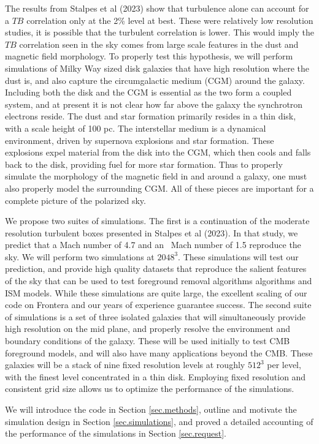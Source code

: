 The results from Stalpes et al (2023) show that turbulence alone can
account for a $TB$  correlation only at the 2\% level at best.   These were
relatively low resolution studies, it is possible that the turbulent correlation
is lower.  This would imply  the $TB$
correlation seen in the sky comes from large scale features in the dust and magnetic field
morphology.  To properly test this hypothesis, we will 
perform simulations of Milky Way sized disk galaxies 
that have high resolution where the dust is, and also capture the circumgalactic
medium (CGM) around the galaxy.  Including both the disk and the CGM is
essential as the two form a coupled system, and at present it is not clear how
far above the galaxy the synchrotron electrons reside.
The dust and star formation
primarily resides in a thin disk, with a scale height of 100 pc.  
The interstellar medium is a dynamical environment,
driven by supernova explosions and star formation.  
These explosions expel
material from the disk into the CGM, which then cools and falls back to the disk,
providing fuel for more star formation.  Thus to properly simulate the
morphology of the magnetic field in and around a galaxy, one must also properly model
the surrounding CGM.
 All of these pieces are important for a complete picture of the
polarized sky.

We propose two suites of simulations.  The first is a continuation of the
moderate resolution turbulent boxes presented in Stalpes et al (2023).  In that
study, we predict that a Mach number of 4.7 and an \alf\ Mach number of 1.5
reproduce the sky.  We will perform two simulations at $2048^3$.  These
simulations will test our prediction, and provide high quality datasets that
reproduce the salient features of the sky that can be used to test foreground
removal algorithms algorithms and ISM models.  While these simulations are quite
large, the excellent scaling of our code on Frontera and our years of experience guarantee success.
The second suite of simulations
is a set of three isolated galaxies that will simultaneously provide high
resolution on the mid plane, and properly resolve the environment and boundary
conditions of the galaxy.  These will be used initially to test CMB foreground
models, and will also have many applications beyond the CMB.  These galaxies
will be a stack of nine fixed resolution levels at roughly $512^3$ per level,
with the finest level concentrated in a thin disk.  Employing fixed
resolution and consistent grid size allows us to optimize the performance of
the simulations.

We will introduce the code in Section \ref{sec.methods}, outline and motivate
the simulation design in Section \ref{sec.simulations}, and proved a detailed
accounting of the performance of the simulations in Section \ref{sec.request}.
